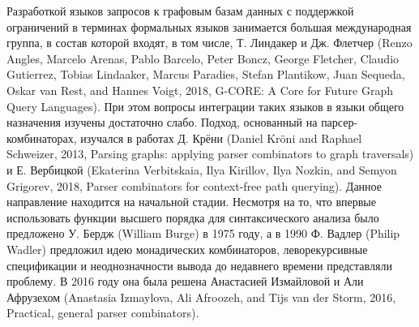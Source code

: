 \documentclass[12pt]{article}  %
\theoremstyle{remark}
\begin{document}
Разработкой языков запросов к графовым базам данных с поддержкой ограничений в терминах формальных языков занимается большая международная группа, в состав которой входят, в том числе, Т. Линдакер и Дж. Флетчер (Renzo Angles, Marcelo Arenas, Pablo Barcelo, Peter Boncz, George Fletcher, Claudio Gutierrez, Tobias Lindaaker, Marcus Paradies, Stefan Plantikow, Juan Sequeda, Oskar van Rest, and Hannes Voigt, 2018, G-CORE: A Core for Future Graph Query Languages). При этом вопросы интеграции таких языков в языки общего назначения изучены достаточно слабо. Подход, основанный на парсер-комбинаторах, изучался в работах Д. Крёни (Daniel Kröni and Raphael Schweizer, 2013, Parsing graphs: applying parser combinators to graph traversals) и Е. Вербицкой (Ekaterina Verbitskaia, Ilya Kirillov, Ilya Nozkin, and Semyon Grigorev, 2018, Parser combinators for context-free path querying). Данное направление находится на начальной стадии.
Несмотря на то, что впервые использовать функции высшего порядка для синтаксического анализа было предложено У. Бердж (William Burge) в 1975 году, а в 1990 Ф. Вадлер (Philip Wadler) предложил идею монадических комбинаторов, леворекурсивные спецификации и неоднозначности вывода до недавнего времени представляли проблему.
В 2016 году она была решена Анастасией Измайловой и Али Афрузехом (Anastasia Izmaylova, Ali Afroozeh, and Tijs van der Storm, 2016, Practical, general parser combinators).
\end{document}
